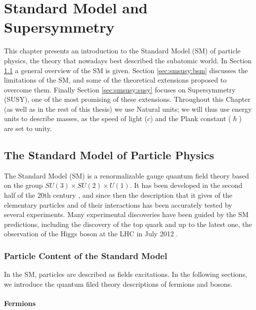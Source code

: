 \chapter{Standard Model and Supersymmetry}
\label{chap:SMSUSY}

This chapter presents an introduction to the Standard Model (SM) of particle physics, the theory that nowadays best described the subatomic world. In Section \ref{sec:smsusy:sm} a general overview of the SM is given. Section \ref{sec:smsusy:bsm} discusses the limitations of the SM, and some of the theoretical extensions proposed to overcome them. Finally Section \ref{sec:smsusy:susy} focuses on Supersymmetry (SUSY), one of the most promising of these extensions. Throughout this Chapter (as well as in the rest of this thesis) we use Natural units; we will thus use energy units to describe masses, as the speed of light ($c$) and the Plank constant ($\hslash$) are set to unity.


\section{The Standard Model of Particle Physics}
\label{sec:smsusy:sm}

The Standard Model (SM) is a renormalizable gauge quantum field theory based on the group $SU(3) \times SU(2) \times U(1)$. It has been developed in the second half of the 20th century \cite{Glashow:1961tr}\cite{Weinberg:1967tq}\cite{Salam:1980jd}, and since then the description that it gives of the elementary particles and of their interactions has been accurately tested by several experiments. Many experimental discoveries have been guided by the SM predictions, including the discovery of the top quark \cite{Abachi:1994td}\cite{PhysRevLett.74.2626} and up to the latest one, the observation of the Higgs boson at the LHC in July 2012 \cite{Aad:2012tfa}\cite{Chatrchyan:2012xdj}. 

\subsection{Particle Content of the Standard Model}

In the SM, particles are described as fields excitations. In the following sections, we introduce the quantum filed theory descriptions of fermions and bosons.

\subsubsection{Fermions}

